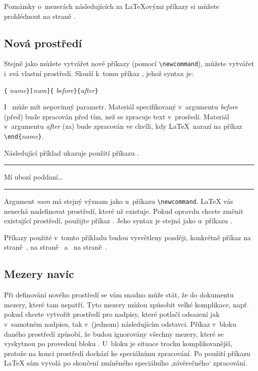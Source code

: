 Poznámky o~mezerách následujících za \LaTeX ovými příkazy si můžete prohlédnout
na straně \pageref{mezery}.

\subsection{Nová prostředí}
Stejně jako můžete vytvářet nové příkazy (pomocí \verb|\newcommand|), můžete
vytvářet i~svá vlastní prostředí. Slouží k~tomu příkaz ,
jehož syntax je:

\begin{lscommand}
\verb|{|%
       \emph{name}\verb|}[|\emph{num}\verb|]{|%
       \emph{before}\verb|}{|\emph{after}\verb|}|
\end{lscommand}

I~ může mít nepovinný parametr. Materiál specifikovaný
v~argumentu \emph{before} (před) bude zpracován před tím, než se zpracuje text
v~prosředí. Materiál v~argumentu \emph{after} (za) bude zpracován ve chvíli,
kdy \LaTeX\ narazí na příkaz \verb|\end{|\emph{name}\verb|}|.

Následující příklad ukazuje použití příkazu .

\begin{example}
\newenvironment{kral}
 {\rule{1ex}{1ex}%
      \hspace{\stretch{1}}}
 {%
      \rule{1ex}{1ex}}

\begin{kral} 
Mí ubozí poddaní\ldots
\end{kral}
\end{example}

Argument \emph{num} má stejný význam jako u~příkazu \verb|\newcommand|.
\LaTeX{} vás nenechá nadefinovat prostředí, které už existuje. Pokud
opravdu chcete změnit existující prostředí, použijte příkaz
. Jeho syntax je stejná jako u~příkazu
.

Příkazy použité v~tomto příkladu budou vysvětleny později, konkrétně
příkaz  na straně~\pageref{sec:rule},  na straně~\pageref{cmd:stretch} a~ na straně~\pageref{sec:hspace}.


\subsection{Mezery navíc}
Při definování nového prostředí se vám snadno může stát, že do dokumentu
 mezery, které tam nepatří. Tyto mezery můžou způsobit
velké komplikace, např. pokud chcete vytvořit prostředí pro nadpisy,
které potlačí odsazení jak v~samotném nadpisu, tak v~(jednom) následujícím
odstavci. Příkaz  v~bloku  daného prostředí
způsobí, že budou ignorovány všechny mezery, které se vyskytnou po
provedení bloku . U~bloku  je situace trochu komplikovanější,
protože na konci prostředí dochází ke speciálnímu zpracování.
Po použití příkazu  \LaTeX{} sám vyvolá 
po skončení zmíněného speciálního ,závěrečného` zpracování.

